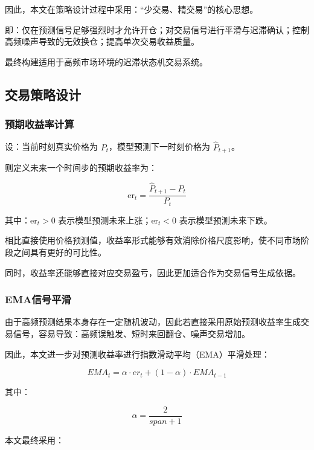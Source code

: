 \documentclass[withoutpreface,bwprint]{cumcmthesis}
\begin{document}
因此，本文在策略设计过程中采用：“少交易、精交易”的核心思想。

即：仅在预测信号足够强烈时才允许开仓；对交易信号进行平滑与迟滞确认；控制高频噪声导致的无效换仓；提高单次交易收益质量。

最终构建适用于高频市场环境的迟滞状态机交易系统。

\subsection{交易策略设计}

\subsubsection{预期收益率计算}

设：当前时刻真实价格为 $P_t$，模型预测下一时刻价格为 $\hat{P}_{t+1}$。

则定义未来一个时间步的预期收益率为：

\begin{equation}
    \text{er}_t = \frac{\hat{P}_{t+1} - P_t}{P_t}
    \label{eq:expected_return}
\end{equation}

其中：$\text{er}_t > 0$ 表示模型预测未来上涨；$\text{er}_t < 0$ 表示模型预测未来下跌。

相比直接使用价格预测值，收益率形式能够有效消除价格尺度影响，使不同市场阶段之间具有更好的可比性。

同时，收益率还能够直接对应交易盈亏，因此更加适合作为交易信号生成依据。

\subsubsection{EMA信号平滑}

由于高频预测结果本身存在一定随机波动，因此若直接采用原始预测收益率生成交易信号，容易导致：高频误触发、短时来回翻仓、噪声交易增加。

因此，本文进一步对预测收益率进行指数滑动平均（EMA）平滑处理：

\begin{equation}
EMA_t = \alpha \cdot er_t + (1-\alpha)\cdot EMA_{t-1}
\end{equation}

其中：

\begin{equation}
\alpha=\frac{2}{span+1}
\end{equation}

本文最终采用：
\end{document}
